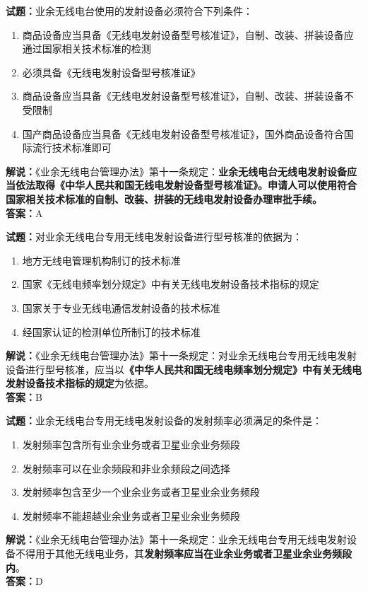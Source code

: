 \documentclass{ctexbook}
\begin{document}
\bigskip




\noindent\textbf{试题：}业余无线电台使用的发射设备必须符合下列条件：
\begin{enumerate}[leftmargin=3em]
\item 商品设备应当具备《无线电发射设备型号核准证》，自制、改装、拼装设备应通过国家相关技术标准的检测
\item 必须具备《无线电发射设备型号核准证》
\item 商品设备应当具备《无线电发射设备型号核准证》，自制、改装、拼装设备不受限制
\item 国产商品设备应当具备《无线电发射设备型号核准证》，国外商品设备符合国际流行技术标准即可
\end{enumerate}
\noindent\textbf{解说：}《业余无线电台管理办法》第十一条规定：\textbf{业余无线电台无线电发射设备应当依法取得《中华人民共和国无线电发射设备型号核准证》。申请人可以使用符合国家相关技术标准的自制、改装、拼装的无线电发射设备办理审批手续。}\\\noindent\textbf{答案：}A

\bigskip




\noindent\textbf{试题：}对业余无线电台专用无线电发射设备进行型号核准的依据为：
\begin{enumerate}[leftmargin=3em]
\item 地方无线电管理机构制订的技术标准
\item 国家《无线电频率划分规定》中有关无线电发射设备技术指标的规定
\item 国家关于专业无线电通信发射设备的技术标准
\item 经国家认证的检测单位所制订的技术标准
\end{enumerate}
\noindent\textbf{解说：}《业余无线电台管理办法》第十一条规定：对业余无线电台专用无线电发射设备进行型号核准，应当以\textbf{《中华人民共和国无线电频率划分规定》中有关无线电发射设备技术指标的规定}为依据。\\\noindent\textbf{答案：}B

\bigskip




\noindent\textbf{试题：}业余无线电台专用无线电发射设备的发射频率必须满足的条件是：
\begin{enumerate}[leftmargin=3em]
\item 发射频率包含所有业余业务或者卫星业余业务频段
\item 发射频率可以在业余频段和非业余频段之间选择
\item 发射频率包含至少一个业余业务或者卫星业余业务频段
\item 发射频率不能超越业余业务或者卫星业余业务频段
\end{enumerate}
\noindent\textbf{解说：}《业余无线电台管理办法》第十一条规定：业余无线电台专用无线电发射设备不得用于其他无线电业务，其\textbf{发射频率应当在业余业务或者卫星业余业务频段内}。\\\noindent\textbf{答案：}D
\end{document}
